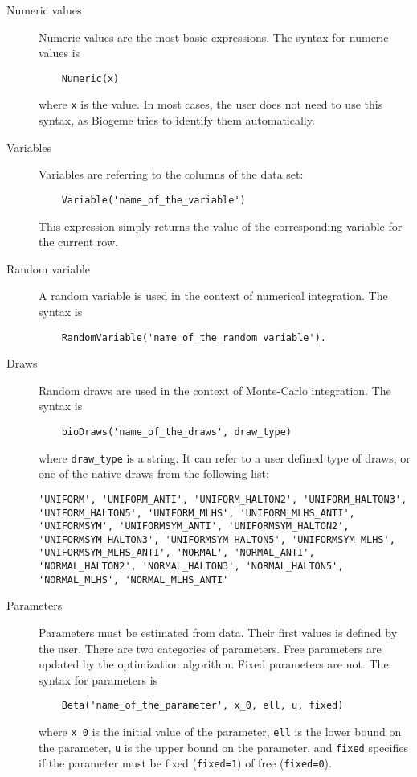 \documentclass[12pt,a4paper]{article}
\begin{document}
\begin{description}
\item[Numeric values] Numeric values are the most basic expressions. The syntax for numeric values is
  \begin{lstlisting}
    Numeric(x)
  \end{lstlisting}
  where \lstinline+x+ is the value. In most cases, the user does not need to use this syntax, as Biogeme tries to identify them automatically.
\item[Variables] Variables are referring to the columns of the data set:
  \begin{lstlisting}
    Variable('name_of_the_variable')
  \end{lstlisting}
  This expression simply returns the value of the corresponding variable for the current row. 
\item[Random variable] A random variable is used in the context of numerical integration.
  The syntax is
  \begin{lstlisting}
    RandomVariable('name_of_the_random_variable').
  \end{lstlisting}
\item[Draws] Random draws are used in the context of Monte-Carlo integration. 
  The syntax is
  \begin{lstlisting}
    bioDraws('name_of_the_draws', draw_type)
  \end{lstlisting}
  where \lstinline+draw_type+ is a string. It can refer to  a user defined type of draws, or one of the native draws from the following list:
  \begin{lstlisting}
'UNIFORM', 'UNIFORM_ANTI', 'UNIFORM_HALTON2', 'UNIFORM_HALTON3', 'UNIFORM_HALTON5', 'UNIFORM_MLHS', 'UNIFORM_MLHS_ANTI', 'UNIFORMSYM', 'UNIFORMSYM_ANTI', 'UNIFORMSYM_HALTON2', 'UNIFORMSYM_HALTON3', 'UNIFORMSYM_HALTON5', 'UNIFORMSYM_MLHS', 'UNIFORMSYM_MLHS_ANTI', 'NORMAL', 'NORMAL_ANTI', 'NORMAL_HALTON2', 'NORMAL_HALTON3', 'NORMAL_HALTON5', 'NORMAL_MLHS', 'NORMAL_MLHS_ANTI'
  \end{lstlisting}
\item[Parameters] Parameters must be estimated from data. Their first values is defined by the user. There are two categories of parameters. Free parameters are updated by the optimization algorithm.
  Fixed parameters are not.
  The syntax for parameters is
  \begin{lstlisting}
    Beta('name_of_the_parameter', x_0, ell, u, fixed)
  \end{lstlisting}
  where \lstinline+x_0+ is the initial value of the parameter,
  \lstinline+ell+ is the lower bound on the parameter, \lstinline+u+ is the upper bound on the parameter, and \lstinline+fixed+ specifies if the parameter must be fixed (\lstinline+fixed=1+) of free (\lstinline+fixed=0+).
\end{description}
\end{document}
